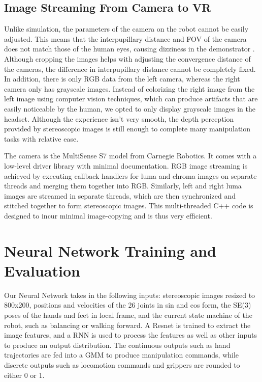 \subsection{Image Streaming From Camera to VR}

Unlike simulation, the parameters of the camera on the robot cannot be easily adjusted. This means that the interpupillary distance and FOV of the camera does not match those of the human eyes, causing dizziness in the demonstrator \cite{distortion}. Although cropping the images helps with adjusting the convergence distance of the cameras, the difference in interpupillary distance cannot be completely fixed. In addition, there is only RGB data from the left camera, whereas the right camera only has grayscale images. Instead of colorizing the right image from the left image using computer vision techniques, which can produce artifacts that are easily noticeable by the human, we opted to only display grayscale images in the headset. Although the experience isn't very smooth, the depth perception provided by stereoscopic images is still enough to complete many manipulation tasks with relative ease. 

The camera is the MultiSense S7 model from Carnegie Robotics. It comes with a low-level driver library with minimal documentation. RGB image streaming is achieved by executing callback handlers for luma and chroma images on separate threads and merging them together into RGB. Similarly, left and right luma images are streamed in separate threads, which are then synchronized and stitched together to form stereoscopic images. This multi-threaded C++ code is designed to incur minimal image-copying and is thus very efficient.

\section{Neural Network Training and Evaluation}

Our Neural Network takes in the following inputs: stereoscopic images resized to 800x200, positions and velocities of the 26 joints in sin and cos form, the SE(3) poses of the hands and feet in local frame, and the current state machine of the robot, such as balancing or walking forward. A Resnet is trained to extract the image features, and a RNN is used to process the features as well as other inputs to produce an output distribution. The continuous outputs such as hand trajectories are fed into a GMM to produce manipulation commands, while discrete outputs such as locomotion commands and grippers are rounded to either 0 or 1. 

